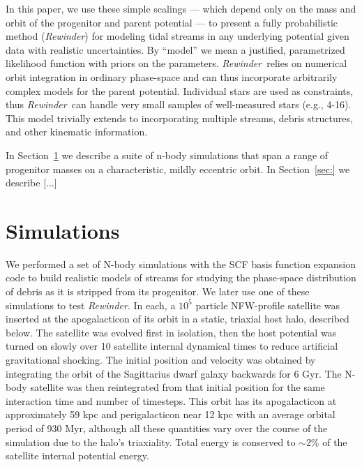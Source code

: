 \documentclass[letterpaper,12pt,preprint]{aastex}
\newcommand{\rewinder}{\emph{Rewinder}}
\begin{document}
In this paper, we use these simple scalings --- which depend only on the mass and orbit of the progenitor and parent potential --- to present a fully probabilistic method (\rewinder) for modeling tidal streams in any underlying potential given data with realistic uncertainties. By ``model'' we mean a justified, parametrized likelihood function with priors on the parameters. \rewinder\ relies on numerical orbit integration in ordinary phase-space and can thus incorporate arbitrarily complex models for the parent potential. Individual stars are used as constraints, thus \rewinder\ can handle very small samples of well-measured stars (e.g., 4-16). This model trivially extends to incorporating multiple streams, debris structures, and other kinematic information. 

In Section~\ref{sec:sims} we describe a suite of n-body simulations that span a range of progenitor masses on a characteristic, mildly eccentric orbit. In Section~\ref{sec:} we describe [...]

\section{Simulations}\label{sec:sims}
We performed a set of N-body simulations with the SCF basis function expansion code \citep{hernquist92} to build realistic models of streams for studying the phase-space distribution of debris as it is stripped from its progenitor. We later use one of these simulations to test \rewinder. In each, a $10^5$ particle NFW-profile satellite was inserted at the apogalacticon of its orbit in a static, triaxial host halo, described below. The satellite was evolved first in isolation, then the host potential was turned on slowly over 10 satellite internal dynamical times to reduce artificial gravitational shocking. The initial position and velocity was obtained by integrating the orbit of the Sagittarius dwarf galaxy \citep[${\bf x}  =(19.0, 2.7, -6.9)\ \mathrm{kpc}, \ {\bf v} = (230., -35., 195.) \ \mathrm{km\ s^{-1}}$;][]{law10} backwards for 6 Gyr. The N-body satellite was then reintegrated from that initial position for the same interaction time and number of timesteps. This orbit has its apogalacticon at approximately 59 kpc and perigalacticon near 12 kpc with an average orbital period of 930 Myr, although all these quantities vary over the course of the simulation due to the halo's triaxiality. Total energy is conserved to $\sim$2\% of the satellite internal potential energy.
\end{document}
